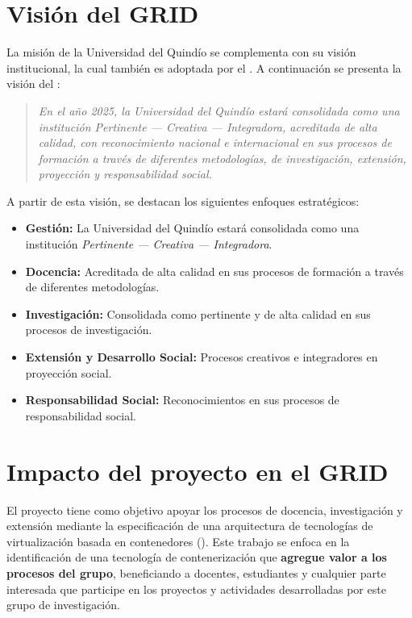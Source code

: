 \section{Visión del GRID}
La misión de la Universidad del Quindío se complementa con su visión institucional, la cual también es adoptada por el \GRID. A continuación se presenta la visión del \GRID:\@

\begin{quote}
\textit{En el año 2025, la Universidad del Quindío estará consolidada como una institución \textit{Pertinente --- Creativa --- Integradora}, acreditada de alta calidad, con reconocimiento nacional e internacional en sus procesos de formación a través de diferentes metodologías, de investigación, extensión, proyección y responsabilidad social.}
\end{quote}

A partir de esta visión, se destacan los siguientes enfoques estratégicos:

\begin{itemize}
    \item \textbf{Gestión:} La Universidad del Quindío estará consolidada como una institución \textit{Pertinente --- Creativa --- Integradora}.

    \item \textbf{Docencia:} Acreditada de alta calidad en sus procesos de formación a través de diferentes metodologías.

    \item \textbf{Investigación:} Consolidada como pertinente y de alta calidad en sus procesos de investigación.

    \item \textbf{Extensión y Desarrollo Social:} Procesos creativos e integradores en proyección social.

    \item \textbf{Responsabilidad Social:} Reconocimientos en sus procesos de responsabilidad social.
\end{itemize}

\section{Impacto del proyecto en el GRID}

El proyecto tiene como objetivo apoyar los procesos de docencia, investigación
y extensión mediante la especificación de una arquitectura de tecnologías de 
virtualización basada en contenedores (\VBC). 
Este trabajo se enfoca en la identificación de una tecnología de contenerización que \textbf{agregue valor a los procesos del grupo}, beneficiando a docentes, estudiantes y cualquier parte interesada que participe en los proyectos y actividades desarrolladas por este grupo de investigación.

